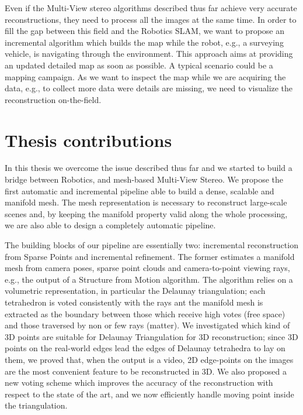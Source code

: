 Even if the Multi-View stereo algorithms described thus far achieve very accurate reconstructions, they need to process all the images at the same time. 
In order to fill the gap between this field and the Robotics SLAM, we want to propose an incremental algorithm which builds the map while the robot, e.g., a surveying vehicle, is navigating through the environment. 
This approach aims at providing an updated detailed map as soon as possible.
A typical scenario could be a mapping campaign.
As we want to inspect the map while we are acquiring the data, e.g., to collect more data were details are missing, we need to visualize the reconstruction on-the-field. 



\section{Thesis contributions}
In this thesis we overcome the issue described thus far and we started to build a bridge between Robotics, and mesh-based Multi-View Stereo.
We propose the first automatic and incremental pipeline able to build a dense, scalable and manifold mesh.
The mesh representation is necessary to reconstruct  large-scale scenes and, by keeping the manifold property valid along the whole processing, we are also able to design a completely automatic pipeline.

The building blocks of our pipeline are essentially two: incremental reconstruction from Sparse Points and incremental refinement.
The former estimates a  manifold mesh from camera poses, sparse point clouds and camera-to-point viewing rays, e.g., the output of a Structure from Motion algorithm.
The algorithm relies on a volumetric representation, in particular the Delaunay triangulation; each tetrahedron is voted consistently with the rays ant the manifold mesh is extracted as the boundary between those which receive high votes (free space) and those traversed by non or few rays (matter).
We investigated which kind of 3D points are suitable for Delaunay Triangulation for 3D reconstruction; since 3D points on the real-world edges lead the edges of Delaunay tetrahedra to lay on them, we proved that, when the output is a video, 2D edge-points on the images are the most convenient feature to be reconstructed in 3D.
We also proposed a new voting scheme which improves the accuracy of the reconstruction with respect to the state of the art, and we now efficiently handle moving point inside the triangulation.

